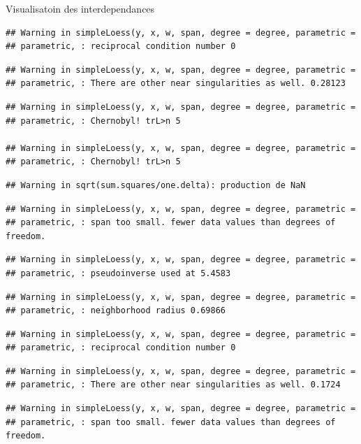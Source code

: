 \documentclass[11pt,ignorenonframetext,]{beamer}
\begin{document}
\begin{frame}[fragile]{Visualisatoin des interdependances}
\begin{verbatim}
## Warning in simpleLoess(y, x, w, span, degree = degree, parametric =
## parametric, : reciprocal condition number 0
\end{verbatim}

\begin{verbatim}
## Warning in simpleLoess(y, x, w, span, degree = degree, parametric =
## parametric, : There are other near singularities as well. 0.28123
\end{verbatim}

\begin{verbatim}
## Warning in simpleLoess(y, x, w, span, degree = degree, parametric =
## parametric, : Chernobyl! trL>n 5

## Warning in simpleLoess(y, x, w, span, degree = degree, parametric =
## parametric, : Chernobyl! trL>n 5
\end{verbatim}

\begin{verbatim}
## Warning in sqrt(sum.squares/one.delta): production de NaN
\end{verbatim}

\begin{verbatim}
## Warning in simpleLoess(y, x, w, span, degree = degree, parametric =
## parametric, : span too small. fewer data values than degrees of freedom.
\end{verbatim}

\begin{verbatim}
## Warning in simpleLoess(y, x, w, span, degree = degree, parametric =
## parametric, : pseudoinverse used at 5.4583
\end{verbatim}

\begin{verbatim}
## Warning in simpleLoess(y, x, w, span, degree = degree, parametric =
## parametric, : neighborhood radius 0.69866
\end{verbatim}

\begin{verbatim}
## Warning in simpleLoess(y, x, w, span, degree = degree, parametric =
## parametric, : reciprocal condition number 0
\end{verbatim}

\begin{verbatim}
## Warning in simpleLoess(y, x, w, span, degree = degree, parametric =
## parametric, : There are other near singularities as well. 0.1724
\end{verbatim}

\begin{verbatim}
## Warning in simpleLoess(y, x, w, span, degree = degree, parametric =
## parametric, : span too small. fewer data values than degrees of freedom.
\end{verbatim}


\end{frame}
\end{document}
